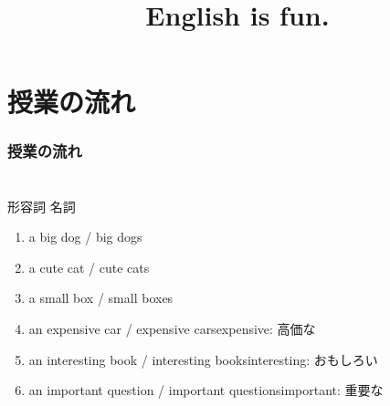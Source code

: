 \documentclass[aspectratio=169,xcolor={dvipsnames,table}]{beamer}
\title{English is fun.}
\subtitle{}
\author{}
\institute[]{}
\date[]
\begin{document}
\begin{frame}[plain]
  \titlepage
\end{frame}

\section*{授業の流れ}
\begin{frame}[plain]
  \frametitle{授業の流れ}
  \tableofcontents
\end{frame}

\section{}
\subsection{}
 \begin{frame}[plain]{形容詞 名詞}
 \begin{enumerate}
  \item a big dog / big dogs
  \item a cute cat / cute cats
  \item a small box / small boxes
  \item an expensive car / expensive cars\hfill{\scriptsize expensive: 高価な}
  \item an interesting book / interesting books\hfill{\scriptsize interesting: おもしろい}
  \item an important question / important questions\hfill{\scriptsize important: 重要な}
 \end{enumerate}

 \end{frame}
\end{document}

